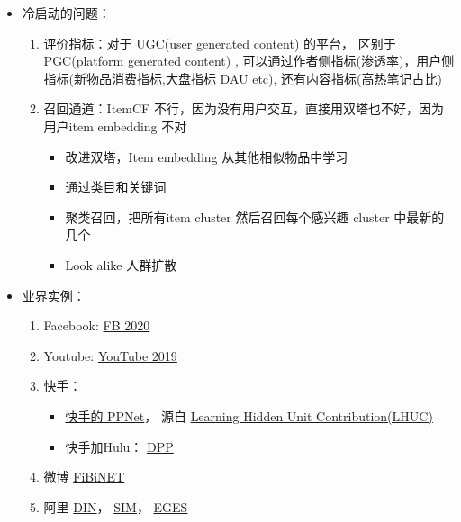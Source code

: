 \documentclass[12pt]{article}
\numberwithin{theorem}{section} %
\numberwithin{definition}{section} %
\numberwithin{assumption}{section} %
\numberwithin{lemma}{section} %
\numberwithin{remark}{section} %
\numberwithin{prop}{section} %
\numberwithin{corollary}{section} %
\numberwithin{example}{section} %
\numberwithin{question}{section} %
\numberwithin{problem}{section} %
\numberwithin{conjecture}{section} %
\numberwithin{append}{section} %
\numberwithin{property}{section} %
\begin{document}
\begin{CJK}{UTF8}{gbsn}
\begin{itemize}
	\item 冷启动的问题：
	\begin{enumerate}
		\item 评价指标：对于 UGC(user generated content) 的平台， 区别于 PGC(platform generated content) , 可以通过作者侧指标(渗透率)，用户侧指标(新物品消费指标,大盘指标 DAU etc), 还有内容指标(高热笔记占比)
		\item 召回通道：ItemCF 不行，因为没有用户交互，直接用双塔也不好，因为用户item embedding 不对 
		\begin{itemize}
			\item 改进双塔，Item embedding 从其他相似物品中学习
			\item 通过类目和关键词
			\item 聚类召回，把所有item cluster 然后召回每个感兴趣 cluster 中最新的几个
			\item Look alike 人群扩散
		\end{itemize}
	\end{enumerate}
	
	\item 业界实例：
	\begin{enumerate}
		\item Facebook: \href{https://arxiv.org/pdf/2006.11632.pdf}{FB 2020}
		\item Youtube: \href{https://storage.googleapis.com/pub-tools-public-publication-data/pdf/6c8a86c981a62b0126a11896b7f6ae0dae4c3566.pdf}{YouTube 2019}
		\item 快手： 
		\begin{itemize}
			\item \href{https://www.51cto.com/article/644214.html}{快手的 PPNet}， 源自 \href{https://www.youtube.com/watch?v=TxIedW94hu0&list=PLvOO0btloRntAi-VnV06M1Bu0X1xljUUP&index=20}{Learning Hidden Unit Contribution(LHUC)}
			\item 快手加Hulu： \href{https://proceedings.neurips.cc/paper/2018/file/dbbf603ff0e99629dda5d75b6f75f966-Paper.pdf}{DPP}
		\end{itemize}
		
		
		
		\item 微博 \href{https://arxiv.org/pdf/1905.09433.pdf}{FiBiNET}
		\item 阿里 \href{https://arxiv.org/pdf/1706.06978.pdf}{DIN}， \href{https://arxiv.org/pdf/2006.05639.pdf}{SIM}， \href{https://github.com/wzhe06/Reco-papers/blob/master/Embedding/[Alibaba%20Embedding]%20Billion-scale%20Commodity%20Embedding%20for%20E-commerce%20Recommendation%20in%20Alibaba%20(Alibaba%202018).pdf}{EGES}
	\end{enumerate}
\end{itemize}


\end{CJK}
\end{document}
